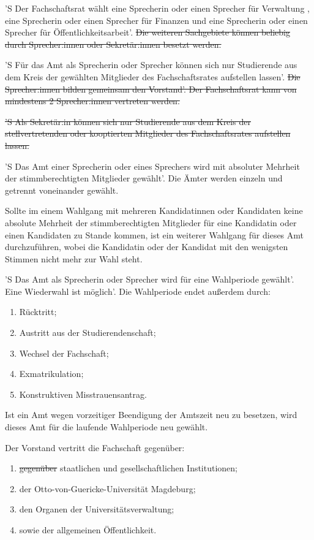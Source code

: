 \documentclass[%
	parskip=half,
]{scrartcl}
\newcommand{\edit}[1]{{\color{red} #1}}
\newcommand{\add}[1]{{\color{blue} #1}}
\newcommand{\delete}[1]{{\color{red} \sout{#1}}}
\begin{document}
\begin{contract}
'S Der Fachschaftsrat wählt \edit{eine Sprecherin oder einen Sprecher} für Verwaltung\edit{, eine Sprecherin oder einen
Sprecher} für Finanzen \add{und eine Sprecherin oder einen Sprecher für Öffentlichkeitsarbeit}'. \delete{Die weiteren
Sachgebiete können beliebig durch Sprecher:innen oder Sekretär:innen besetzt werden.}

'S \edit{Für das Amt als Sprecherin oder Sprecher} können sich nur Studierende aus dem Kreis der gewählten Mitglieder
des Fachschaftsrates aufstellen lassen'. \delete{Die Sprecher:innen bilden gemeinsam den Vorstand'. Der Fachschaftsrat
kann von mindestens 2 Sprecher:innen vertreten werden.}

\delete{'S Als Sekretär:in können sich nur Studierende aus dem Kreis der stellvertretenden oder kooptierten Mitglieder 
des Fachschaftsrates aufstellen lassen.}


'S \edit{Das Amt einer Sprecherin oder eines Sprechers} wird mit absoluter Mehrheit der stimmberechtigten Mitglieder
gewählt'. Die \edit{Ämter} werden einzeln und getrennt voneinander gewählt.

Sollte im einem Wahlgang mit mehreren \edit{Kandidatinnen oder Kandidaten} keine absolute Mehrheit der 
stimmberechtigten Mitglieder für \edit{eine Kandidatin oder einen Kandidaten} zu Stande kommen, ist ein weiterer 
Wahlgang für dieses \edit{Amt} durchzuführen, wobei \edit{die Kandidatin oder der Kandidat} mit den wenigsten Stimmen 
nicht mehr zur Wahl steht.

'S \edit{Das Amt als Sprecherin oder Sprecher} wird für eine Wahlperiode gewählt'. Eine Wiederwahl ist möglich'. Die
Wahlperiode endet außerdem durch:
\begin{enumerate}[\qquad a)]
	\item Rücktritt;
	\item Austritt aus der Studierendenschaft;
	\item Wechsel der Fachschaft;
	\item Exmatrikulation;
	\item Konstruktiven Misstrauensantrag.
\end{enumerate}

Ist ein Amt wegen vorzeitiger Beendigung der Amtszeit neu zu besetzen, wird dieses Amt für die laufende Wahlperiode neu 
gewählt.

\Clause{title={Aufgaben und Rechte \edit{des Vorstands}}}

\edit{Der Vorstand vertritt} die Fachschaft \add{gegenüber}:
\begin{enumerate}[\qquad a)]
	\item \delete{gegenüber} staatlichen und gesellschaftlichen Institutionen;
	\item der Otto-von-Guericke-Universität Magdeburg;
	\item den Organen der Universitätsverwaltung;
	\item sowie der allgemeinen Öffentlichkeit.
\end{enumerate}


\end{contract}
\end{document}
